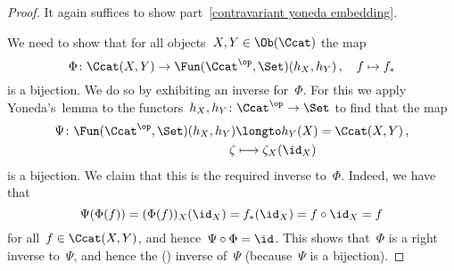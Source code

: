 \begin{proof}
  It again suffices to show part~\ref*{contravariant yoneda embedding}.
  
  We need to show that for all objects~$X, Y \in \Ob(\Ccat)$ the map
  \[
            \Phi
    \colon  \Ccat(X,Y)
    \to     \Fun(\Ccat^\op, \Set)(h_X, h_Y) \,,
    \quad   f
    \mapsto f_*
  \]
  is a bijection.
  We do so by exhibiting an inverse for~$\Phi$.
  For this we apply Yoneda’s~lemma to the functors~$h_X, h_Y \colon \Ccat^\op \to \Set$ to find that the map
  \begin{align*}
              \Psi
     \colon   \Fun(\Ccat^\op, \Set)(h_X, h_Y)
    &\longto  h_Y(X)
     =        \Ccat(X,Y)  \,,
    \\
                  \zeta
    &\longmapsto  \zeta_X(\id_X)
  \end{align*}
  is a bijection.
  We claim that this is the required inverse to~$\Phi$.
  Indeed, we have that
  \[
      \Psi(\Phi(f))
    = (\Phi(f))_X(\id_X)
    = f_*(\id_X)
    = f \circ {\id_X}
    = f
  \]
  for all~$f \in \Ccat(X,Y)$, and hence~$\Psi \circ \Phi = \id$.
  This shows that~$\Phi$ is a right inverse to~$\Psi$, and hence the ({\twosided}) inverse of~$\Psi$ (because~$\Psi$ is a bijection).
\end{proof}



